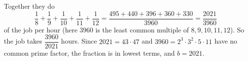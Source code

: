 Together they do
\[\dfrac18+\dfrac19+\dfrac1{10}+\dfrac1{11}+\dfrac1{12}=\dfrac{495+440+396+360+330}{3960}=\dfrac{2021}{3960}\]
of the job per hour (here $3960$ is the least common multiple of $8,9,10,11,12$). So the job takes $\dfrac{3960}{2021}$ hours. Since $2021=43\cdot47$ and $3960=2^3\cdot3^2\cdot5\cdot11$ have no common prime factor, the fraction is in lowest terms, and $b=\boxed{2021}$.
